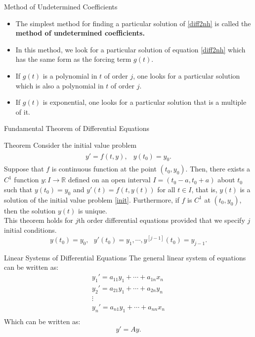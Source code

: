 \documentclass{beamer}
\begin{document}
\begin{frame}{Method of Undetermined Coefficients}
    \begin{itemize}
        \item The simplest method for finding a particular solution of \eqref{diff2nh} is called the \textbf{method of undetermined coefficients.}
        \item In this method, we look for a particular solution of equation \eqref{diff2nh} which has the same form as the forcing term $g(t).$
        \item If $g(t)$ is a polynomial in $t$ of order $j$, one looks for a particular solution which is also a polynomial in $t$ of order $j$. 
        \item If $g(t)$ is exponential, one looks for a particular solution that is a multiple of it.
    \end{itemize}
\end{frame}
\begin{frame}{Fundamental Theorem of Differential Equations}
  \begin{block}{Theorem}
    Consider the initial value problem
    \begin{align}
        \begin{array}{cc}
             y'=f(t,y), & y(t_0)=y_0.
        \end{array}
        \label{init}
    \end{align}
    Suppose that $f$ is continuous function at the point $(t_0, y_0)$. Then, there exists a $C^1$ function $y:I\to \mathbb{R}$ defined on an open interval $I=(t_0-a, t_0+a)$ about $t_0$ such that $y(t_0)=y_0$ and $y'(t)=f(t,y(t)) $ for all $t\in I$, that is, $y(t)$ is a solution of the initial value problem \eqref{init}. Furthermore, if $f$ is $C^1$ at $(t_0, y_0)$, then the solution $y(t)$ is unique.
    \\ This theorem holds for $j$th order differential equations provided that we specify $j$ initial conditions.
    \[y(t_0)=y_0, \text{ }y'(t_0)=y_1, \cdots, y^{[j-1]}(t_0)=y_{j-1}.
    \]
    \end{block}  
\end{frame}

\begin{frame}{Linear Systems of Differential Equations}
    The general linear system of equations can be written as:
    \begin{align*}
        y_1'=a_{11}y_1+\cdots +a_{1n}x_n\\
        y_2'=a_{21}y_1+\cdots +a_{2n}y_n\\ 
        \vdots \\
        y_n'=a_{n1}y_1+\cdots +a_{nn}x_n\\
    \end{align*}
    Which can be written as:
    \begin{equation}
        y'=Ay.\label{diffmatrix}
    \end{equation}
    \end{frame}
\end{document}
